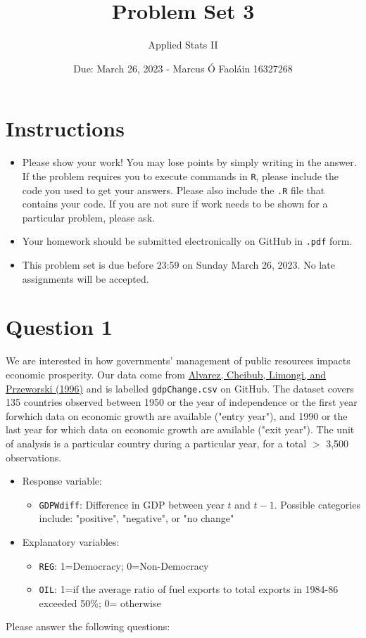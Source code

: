 \documentclass[12pt,letterpaper]{article}
\title{Problem Set 3}
\date{Due: March 26, 2023 - Marcus Ó Faoláin 16327268}
\author{Applied Stats II}
\begin{document}
	\maketitle
	\section*{Instructions}
	\begin{itemize}
	\item Please show your work! You may lose points by simply writing in the answer. If the problem requires you to execute commands in \texttt{R}, please include the code you used to get your answers. Please also include the \texttt{.R} file that contains your code. If you are not sure if work needs to be shown for a particular problem, please ask.
\item Your homework should be submitted electronically on GitHub in \texttt{.pdf} form.
\item This problem set is due before 23:59 on Sunday March 26, 2023. No late assignments will be accepted.
	\end{itemize}

	\vspace{.25cm}
\section*{Question 1}
\vspace{.25cm}
\noindent We are interested in how governments' management of public resources impacts economic prosperity. Our data come from \href{https://www.researchgate.net/profile/Adam_Przeworski/publication/240357392_Classifying_Political_Regimes/links/0deec532194849aefa000000/Classifying-Political-Regimes.pdf}{Alvarez, Cheibub, Limongi, and Przeworski (1996)} and is labelled \texttt{gdpChange.csv} on GitHub. The dataset covers 135 countries observed between 1950 or the year of independence or the first year forwhich data on economic growth are available ("entry year"), and 1990 or the last year for which data on economic growth are available ("exit year"). The unit of analysis is a particular country during a particular year, for a total $>$ 3,500 observations. 

\begin{itemize}
	\item
	Response variable: 
	\begin{itemize}
		\item \texttt{GDPWdiff}: Difference in GDP between year $t$ and $t-1$. Possible categories include: "positive", "negative", or "no change"
	\end{itemize}
	\item
	Explanatory variables: 
	\begin{itemize}
		\item
		\texttt{REG}: 1=Democracy; 0=Non-Democracy
		\item
		\texttt{OIL}: 1=if the average ratio of fuel exports to total exports in 1984-86 exceeded 50\%; 0= otherwise
	\end{itemize}
	
\end{itemize}
\newpage
\noindent Please answer the following questions:
\end{document}
